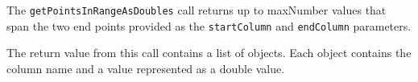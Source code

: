 The \verb+getPointsInRangeAsDoubles+ call returns up to maxNumber values that span the two end points provided as the
\verb+startColumn+ and \verb+endColumn+ parameters.

The return value from this call contains a list of objects. Each object contains the column name and a value represented
as a double value.
